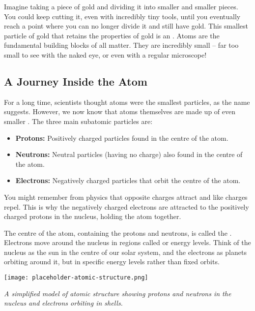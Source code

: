 Imagine taking a piece of gold and dividing it into smaller and smaller pieces.  You could keep cutting it, even with incredibly tiny tools, until you eventually reach a point where you can no longer divide it and still have gold.  This smallest particle of gold that retains the properties of gold is an . Atoms are the fundamental building blocks of all matter. They are incredibly small – far too small to see with the naked eye, or even with a regular microscope!

\subsection{A Journey Inside the Atom}

For a long time, scientists thought atoms were the smallest particles, as the name suggests. However, we now know that atoms themselves are made up of even smaller .  The three main subatomic particles are:

\begin{itemize}
    \item \textbf{Protons:} Positively charged particles found in the centre of the atom.
    \item \textbf{Neutrons:}  Neutral particles (having no charge) also found in the centre of the atom.
    \item \textbf{Electrons:} Negatively charged particles that orbit the centre of the atom.
\end{itemize}

\begin{marginnote}
  You might remember from physics that opposite charges attract and like charges repel.  This is why the negatively charged electrons are attracted to the positively charged protons in the nucleus, holding the atom together.
\end{marginnote}

The centre of the atom, containing the protons and neutrons, is called the .  Electrons move around the nucleus in regions called  or energy levels.  Think of the nucleus as the sun in the centre of our solar system, and the electrons as planets orbiting around it, but in specific energy levels rather than fixed orbits.

\begin{marginfigure}
\texttt{[image: placeholder-atomic-structure.png]}
\caption*{\textit{A simplified model of atomic structure showing protons and neutrons in the nucleus and electrons orbiting in shells.}}
\end{marginfigure}

